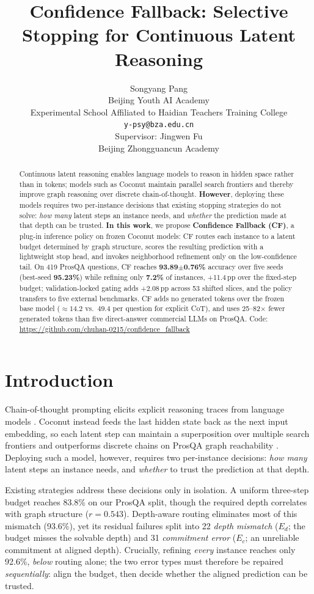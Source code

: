 \documentclass{article}
\title{Confidence Fallback: Selective Stopping for Continuous Latent Reasoning}
\author{Songyang Pang \\
Beijing Youth AI Academy \\
Experimental School Affiliated to Haidian Teachers Training College \\
\texttt{y-psy@bza.edu.cn} \\
Supervisor: Jingwen Fu \\
Beijing Zhongguancun Academy
}
\theoremstyle{compactthm}
\theoremstyle{compactdef}
\begin{document}
\maketitle
\thispagestyle{fancy}

\begin{abstract}
Continuous latent reasoning enables language models to reason in hidden space rather than in tokens; models such as Coconut maintain parallel search frontiers and thereby improve graph reasoning over discrete chain-of-thought. \textbf{However}, deploying these models requires two per-instance decisions that existing stopping strategies do not solve: \emph{how many} latent steps an instance needs, and \emph{whether} the prediction made at that depth can be trusted. \textbf{In this work}, we propose \textbf{Confidence Fallback (CF)}, a plug-in inference policy on frozen Coconut models: CF routes each instance to a latent budget determined by graph structure, scores the resulting prediction with a lightweight stop head, and invokes neighborhood refinement only on the low-confidence tail. On 419 ProsQA questions, CF reaches \textbf{93.89$\pm$0.76\%} accuracy over five seeds (best-seed \textbf{95.23\%}) while refining only \textbf{7.2\%} of instances, +11.4\,pp over the fixed-step budget; validation-locked gating adds +2.08\,pp across 53 shifted slices, and the policy transfers to five external benchmarks. CF adds no generated tokens over the frozen base model (${\approx}14.2$ vs.\ $49.4$ per question for explicit CoT), and uses 25--82$\times$ fewer generated tokens than five direct-answer commercial LLMs on ProsQA. Code: \url{https://github.com/chuhan-0215/confidence_fallback}
\end{abstract}

\section{Introduction}
Chain-of-thought prompting elicits explicit reasoning traces from language models \citep{wei2022chain}. Coconut instead feeds the last hidden state back as the next input embedding, so each latent step can maintain a superposition over multiple search frontiers \citep{hao2024coconut,zhu2025superposition} and outperforms discrete chains on ProsQA graph reachability \citep{hao2024coconut}. Deploying such a model, however, requires two per-instance decisions: \emph{how many} latent steps an instance needs, and \emph{whether} to trust the prediction at that depth.

Existing strategies address these decisions only in isolation. A uniform three-step budget reaches 83.8\% on our ProsQA split, though the required depth correlates with graph structure ($r=0.543$). Depth-aware routing eliminates most of this mismatch (93.6\%), yet its residual failures split into 22 \emph{depth mismatch} ($E_d$; the budget misses the solvable depth) and 31 \emph{commitment error} ($E_c$; an unreliable commitment at aligned depth). Crucially, refining \emph{every} instance reaches only 92.6\%, \emph{below} routing alone; the two error types must therefore be repaired \emph{sequentially}: align the budget, then decide whether the aligned prediction can be trusted.
\end{document}
